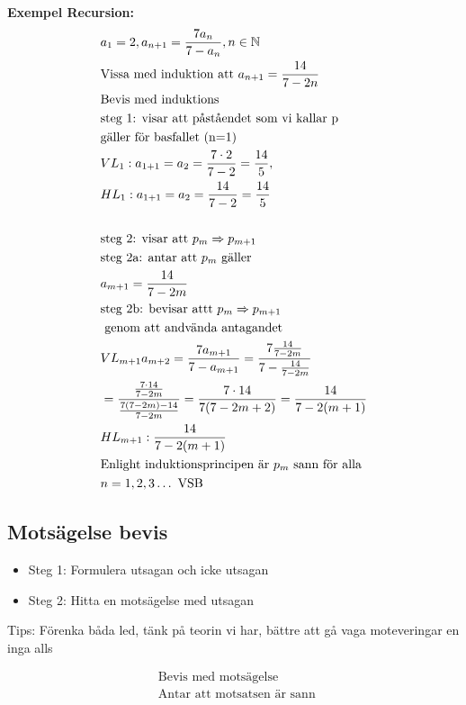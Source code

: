 \begin{multicols}{2}
\textbf{Exempel Recursion:}
\begin{align*}
  &a_1 = 2, a_{n+1} = \frac{7a_n}{7-a_n}, n \in \mathbb{N} \\
  &\text{Vissa med induktion att } a_{n+1} = \frac{14}{7-2n} \\ 
  &\text{Bevis med induktions} \\
  &\text{steg 1: visar att påståendet som vi kallar p } \\
  &\text{gäller för basfallet (n=1)} \\
  &VL_1: a_{1+1}=a_2=\frac{7 \cdot 2}{7-2}=\frac{14}{5}, \\
  &HL_1: a_{1+1}=a_2=\frac{14}{7-2}=\frac{14}{5} \\
  &\\
  &\text{steg 2: visar att } p_m \Rightarrow p_{m+1} \\
  &\text{steg 2a: antar att } p_m \text{ gäller} \\
  &a_{m+1}=\frac{14}{7-2m}\\
  &\text{steg 2b: bevisar attt } p_m \Rightarrow p_{m+1} \\
  &\text{ genom att andvända antagandet} \\
  &VL_{m+1}a_{m+2} 
  = \frac{7a_{m+1}}{7-a_{m+1}} 
  = \frac{7 \frac{14}{7-2m}}{7-\frac{14}{7-2m}} \\
  &= \frac{\frac{7 \cdot14}{7-2m}}{\frac{7(7-2m) - 14}{7-2m}} 
  = \frac{7 \cdot 14}{7(7-2m+2)}
  = \frac{14}{7-2(m+1)} \\
  &HL_{m+1}: \frac{14}{7-2(m+1)} \\
  &\text{Enlight induktionsprincipen är $ p_m $ sann för alla } \\
  &n = 1,2,3 \ldots \text{ VSB}  \\
\end{align*}

\subsection{Motsägelse bevis}
\begin{itemize}
  \item Steg 1: Formulera utsagan och icke utsagan
  \item Steg 2: Hitta en motsägelse med utsagan
\end{itemize}
Tips: Förenka båda led, tänk på teorin vi har, bättre att gå vaga moteveringar en inga alls \newline

\begin{align*}
  &\text{Bevis med motsägelse } \\
  &\text{Antar att motsatsen är sann  } \\
\end{align*}



\end{multicols}
